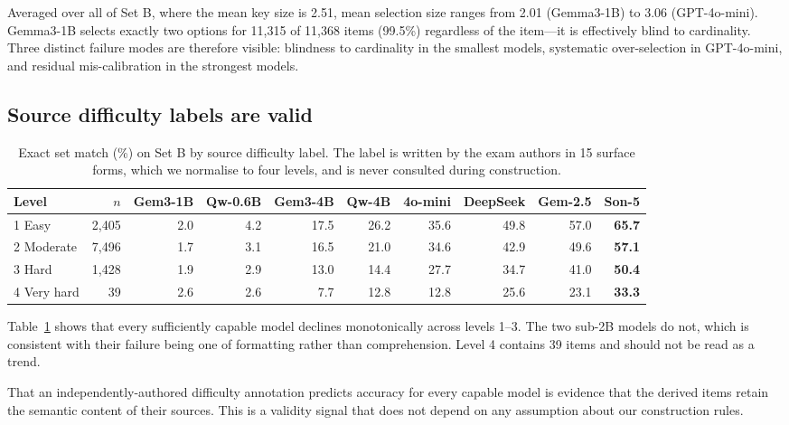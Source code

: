 \documentclass{article} %
\begin{document}
Averaged over all of Set B, where the mean key size is 2.51, mean selection size ranges
from 2.01 (Gemma3-1B) to 3.06 (GPT-4o-mini). Gemma3-1B selects exactly two options for
11,315 of 11,368 items (99.5\%) regardless of the item---it is effectively blind to
cardinality. Three distinct failure modes are therefore visible: blindness to cardinality
in the smallest models, systematic over-selection in GPT-4o-mini, and residual
mis-calibration in the strongest models.

\subsection{Source difficulty labels are valid}

\begin{table}[t]
\caption{Exact set match (\%) on Set B by source difficulty label. The label is written by
the exam authors in 15 surface forms, which we normalise to four levels, and is never
consulted during construction.}
\label{tab:difficulty}
\begin{center}
\begin{small}
\begin{tabular}{lrrrrrrrrr}
\toprule
\textbf{Level} & \textbf{$n$} & \textbf{Gem3-1B} & \textbf{Qw-0.6B} & \textbf{Gem3-4B} &
\textbf{Qw-4B} & \textbf{4o-mini} & \textbf{DeepSeek} & \textbf{Gem-2.5} & \textbf{Son-5} \\
\midrule
1 Easy      & 2,405 & 2.0 & 4.2 & 17.5 & 26.2 & 35.6 & 49.8 & 57.0 & \textbf{65.7} \\
2 Moderate  & 7,496 & 1.7 & 3.1 & 16.5 & 21.0 & 34.6 & 42.9 & 49.6 & \textbf{57.1} \\
3 Hard      & 1,428 & 1.9 & 2.9 & 13.0 & 14.4 & 27.7 & 34.7 & 41.0 & \textbf{50.4} \\
4 Very hard &    39 & 2.6 & 2.6 &  7.7 & 12.8 & 12.8 & 25.6 & 23.1 & \textbf{33.3} \\
\bottomrule
\end{tabular}
\end{small}
\end{center}
\end{table}

Table~\ref{tab:difficulty} shows that every sufficiently capable model declines
monotonically across levels 1--3. The two sub-2B models do not, which is consistent with
their failure being one of formatting rather than comprehension. Level 4 contains 39 items
and should not be read as a trend.

That an independently-authored difficulty annotation predicts accuracy for every capable
model is evidence that the derived items retain the semantic content of their sources. This
is a validity signal that does not depend on any assumption about our construction rules.
\end{document}
